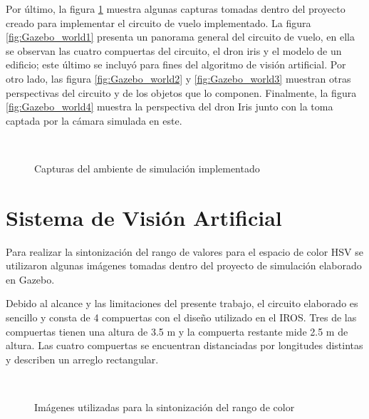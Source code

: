 Por último, la figura \ref{fig:Gazebo_worlds} muestra algunas capturas tomadas dentro del proyecto creado para implementar el circuito de vuelo implementado. La figura \ref{fig:Gazebo_world1} presenta un panorama general del circuito de vuelo, en ella se observan las cuatro compuertas del circuito, el dron iris y el modelo de un edificio; este último se incluyó para fines del algoritmo de visión artificial. Por otro lado, las figura \ref{fig:Gazebo_world2} y \ref{fig:Gazebo_world3}  muestran otras perspectivas del circuito y de los objetos que lo componen. Finalmente, la figura \ref{fig:Gazebo_world4} muestra la perspectiva del dron Iris junto con la toma captada por la cámara simulada en este.

\begin{figure}[ht]
    \centering
    \hfill
    \\
    \hfill
    \hfill

    \caption{Capturas del ambiente de simulación implementado}
    \label{fig:Gazebo_worlds}
\end{figure}

\newpage


\section{Sistema de Visión Artificial}
Para realizar la sintonización del rango de valores para el espacio de color HSV se utilizaron algunas imágenes tomadas dentro del proyecto de simulación elaborado en Gazebo.

Debido al alcance y las limitaciones del presente trabajo, el circuito elaborado es sencillo y consta de 4 compuertas con el diseño utilizado en el IROS. Tres de las compuertas tienen una altura de 3.5 m y la compuerta restante mide 2.5 m de altura. Las cuatro compuertas se encuentran distanciadas por longitudes distintas y describen un arreglo rectangular.

\begin{figure}[ht]
    \centering
    \hfill
    \\
    \hfill
    \hfill

    \caption{Imágenes utilizadas para la sintonización del rango de color}
    \label{fig:cv_gates}
\end{figure}

